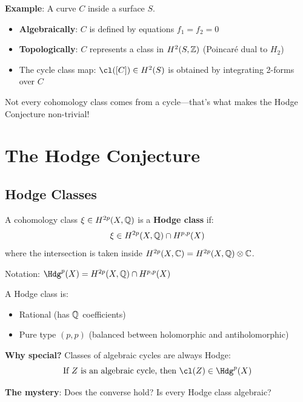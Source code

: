 \begin{intuitive}
\textbf{Example}: A curve $C$ inside a surface $S$.

\begin{itemize}
\item \textbf{Algebraically}: $C$ is defined by equations $f_1 = f_2 = 0$
\item \textbf{Topologically}: $C$ represents a class in $H^2(S, \mathbb{Z})$ (Poincaré dual to $H_2$)
\item The cycle class map: $\cl([C]) \in H^2(S)$ is obtained by integrating 2-forms over $C$
\end{itemize}

Not every cohomology class comes from a cycle—that's what makes the Hodge Conjecture non-trivial!
\end{intuitive}

\section{The Hodge Conjecture}

\subsection{Hodge Classes}

\begin{defn}\label{def:hodge-class}
A cohomology class $\xi \in H^{2p}(X, \mathbb{Q})$ is a \textbf{Hodge class} if:
\begin{equation}
\xi \in H^{2p}(X, \mathbb{Q}) \cap H^{p,p}(X)
\end{equation}
where the intersection is taken inside $H^{2p}(X, \mathbb{C}) = H^{2p}(X, \mathbb{Q}) \otimes \mathbb{C}$.

Notation: $\Hdg^p(X) = H^{2p}(X, \Q) \cap H^{p,p}(X)$
\end{defn}

\begin{keyidea}
A Hodge class is:
\begin{itemize}
\item Rational (has $\mathbb{Q}$ coefficients)
\item Pure type $(p,p)$ (balanced between holomorphic and antiholomorphic)
\end{itemize}

\textbf{Why special?} Classes of algebraic cycles are always Hodge:
\begin{equation}
\text{If } Z \text{ is an algebraic cycle, then } \cl(Z) \in \Hdg^p(X)
\end{equation}

\textbf{The mystery}: Does the converse hold? Is every Hodge class algebraic?
\end{keyidea}

